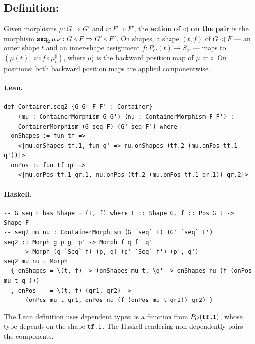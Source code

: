 \documentclass[11pt,a4paper]{article}
\begin{document}
\subsection{Definition: }

\begin{defn}
Given morphisms $\mu : G \Rightarrow G'$ and $\nu : F \Rightarrow F'$, the
\textbf{action of $\triangleleft$ on the pair} is the morphism
$\texttt{seq}_2\,\mu\,\nu : G \triangleleft F \Rightarrow G' \triangleleft F'$.
On shapes, a shape $(t, f)$ of $G \triangleleft F$ --- an outer shape $t$ and
an inner-shape assignment $f : P_G(t) \to S_F$ --- maps to
$(\mu(t),\; \nu \circ f \circ \mu^\sharp_t)$, where $\mu^\sharp_t$ is the
backward position map of $\mu$ at $t$.
On positions: both backward position maps are applied componentwise.
\end{defn}

\paragraph{Lean.}
\begin{lstlisting}[style=lean]
def Container.seq2 {G G' F F' : Container}
    (mu : ContainerMorphism G G') (nu : ContainerMorphism F F') :
    ContainerMorphism (G seq F) (G' seq F') where
  onShapes := fun tf =>
    <|mu.onShapes tf.1, fun q' => nu.onShapes (tf.2 (mu.onPos tf.1 q'))|>
  onPos := fun tf qr =>
    <|mu.onPos tf.1 qr.1, nu.onPos (tf.2 (mu.onPos tf.1 qr.1)) qr.2|>
\end{lstlisting}

\paragraph{Haskell.}
\begin{lstlisting}[style=haskell]
-- G seq F has Shape = (t, f) where t :: Shape G, f :: Pos G t -> Shape F
-- seq2 mu nu : ContainerMorphism (G `seq` F) (G' `seq` F')
seq2 :: Morph g p g' p' -> Morph f q f' q'
     -> Morph (g `Seq` f) (p, q) (g' `Seq` f') (p', q')
seq2 mu nu = Morph
  { onShapes = \(t, f) -> (onShapes mu t, \q' -> onShapes nu (f (onPos mu t q')))
  , onPos    = \(t, f) (qr1, qr2) ->
      (onPos mu t qr1, onPos nu (f (onPos mu t qr1)) qr2) }
\end{lstlisting}

\begin{fidelitynote}
The Lean definition uses dependent types:  is a function from
$P_G(\texttt{tf.1})$, whose type depends on the shape $\texttt{tf.1}$.  The Haskell
rendering non-dependently pairs the components.
\end{fidelitynote}
\end{document}
